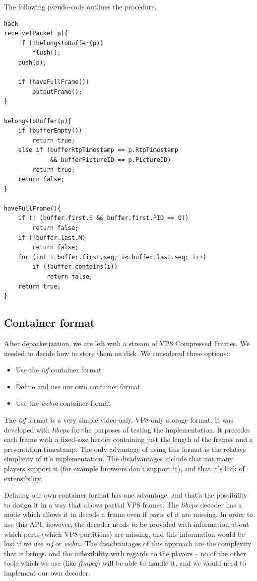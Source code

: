 \documentclass[twoside,openright,a4paper,12pt,english]{article}
\begin{document}
The following pseudo-code outlines the procedure.

\begin{lstlisting}[frame=single]  % Start your code-block
hack
receive(Packet p){
    if (!belongsToBuffer(p))
        flush();
    push(p);

    if (haveFullFrame())
        outputFrame();
}

belongsToBuffer(p){
    if (bufferEmpty())
        return true;
    else if (bufferRtpTimestamp == p.RtpTimestamp 
             && bufferPictureID == p.PictureID)
        return true;
    return false;
}

haveFullFrame(){
    if (! (buffer.first.S && buffer.first.PID == 0))
        return false;
    if (!buffer.last.M)
        return false;
    for (int i=buffer.first.seq; i<=buffer.last.seq; i++)
        if (!buffer.contains(i))
            return false;
    return true;
}
\end{lstlisting}


\subsection{Container format}
After depacketization, we are left with a stream of VP8 Compressed Frames. We needed to decide how to store them on disk. We considered three options:
\begin{itemize}
\item Use the \emph{ivf} container format
\item Define and use our own container format
\item Use the \emph{webm} container format
\end{itemize}

The \emph{ivf} format is a very simple video-only, VP8-only storage format. It
was developed with \emph{libvpx} for the purposes of testing the
implementation. It precedes each frame with a fixed-size header containing just
the length of the frames and a presentation timestamp. The only advantage of
using this format is the relative simplicity of it's implementation. The disadvantages
include that not many players support it (for example browsers don't support it), and
that it's lack of extensibility.

Defining our own container format has one advantage, and that's the possibility
to design it in a way that allows partial VP8 frames. The \emph{libvpx} decoder
has a mode which allows it to decode a frame even if parts of it are missing.
In order to use this API, however, the decoder needs to be provided with
information about which parts (which VP8 partitions) are missing, and this
information would be lost if we use \emph{ivf} or \emph{webm}. The
disadvantages of this approach are the complexity that it brings, and the
inflexibility with regards to the players -- no of the other tools which
we use (like \emph{ffmpeg}) will be able to handle it, and we would need to
implement our own decoder.
\end{document}
